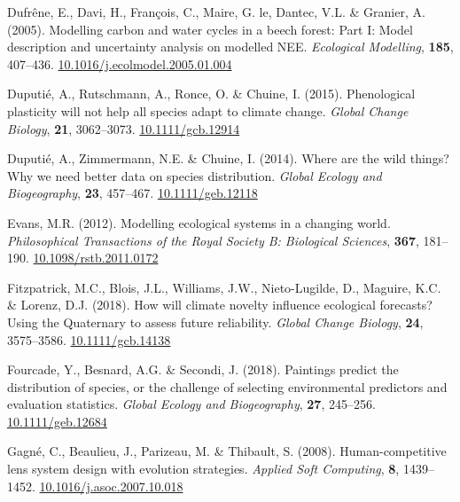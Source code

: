 \documentclass[11pt,]{article}
\newlength{\cslhangindent}
\newenvironment{CSLReferences}[2] %
 {%
  \setlength{\parindent}{0pt}
  \ifodd #1 \everypar{\setlength{\hangindent}{\cslhangindent}}\ignorespaces\fi
  \ifnum #2 > 0
  \setlength{\parskip}{#2\baselineskip}
  \fi
 }%
 {}
\begin{document}
\begin{CSLReferences}{1}{0}
\leavevmode{}%
Dufrêne, E., Davi, H., François, C., Maire, G. le, Dantec, V.L. \&
Granier, A. (2005). Modelling carbon and water cycles in a beech forest:
{Part} {I}: {Model} description and uncertainty analysis on modelled
{NEE}. \emph{Ecological Modelling}, \textbf{185}, 407--436.
\href{https://doi.org/10.1016/j.ecolmodel.2005.01.004}{10.1016/j.ecolmodel.2005.01.004}

\leavevmode{}%
Duputié, A., Rutschmann, A., Ronce, O. \& Chuine, I. (2015).
Phenological plasticity will not help all species adapt to climate
change. \emph{Global Change Biology}, \textbf{21}, 3062--3073.
\href{https://doi.org/10.1111/gcb.12914}{10.1111/gcb.12914}

\leavevmode{}%
Duputié, A., Zimmermann, N.E. \& Chuine, I. (2014). Where are the wild
things? Why we need better data on species distribution. \emph{Global
Ecology and Biogeography}, \textbf{23}, 457--467.
\href{https://doi.org/10.1111/geb.12118}{10.1111/geb.12118}

\leavevmode{}%
Evans, M.R. (2012). Modelling ecological systems in a changing world.
\emph{Philosophical Transactions of the Royal Society B: Biological
Sciences}, \textbf{367}, 181--190.
\href{https://doi.org/10.1098/rstb.2011.0172}{10.1098/rstb.2011.0172}

\leavevmode{}%
Fitzpatrick, M.C., Blois, J.L., Williams, J.W., Nieto-Lugilde, D.,
Maguire, K.C. \& Lorenz, D.J. (2018). How will climate novelty influence
ecological forecasts? {Using} the {Quaternary} to assess future
reliability. \emph{Global Change Biology}, \textbf{24}, 3575--3586.
\href{https://doi.org/10.1111/gcb.14138}{10.1111/gcb.14138}

\leavevmode{}%
Fourcade, Y., Besnard, A.G. \& Secondi, J. (2018). Paintings predict the
distribution of species, or the challenge of selecting environmental
predictors and evaluation statistics. \emph{Global Ecology and
Biogeography}, \textbf{27}, 245--256.
\href{https://doi.org/10.1111/geb.12684}{10.1111/geb.12684}

\leavevmode{}%
Gagné, C., Beaulieu, J., Parizeau, M. \& Thibault, S. (2008).
Human-competitive lens system design with evolution strategies.
\emph{Applied Soft Computing}, \textbf{8}, 1439--1452.
\href{https://doi.org/10.1016/j.asoc.2007.10.018}{10.1016/j.asoc.2007.10.018}


\end{CSLReferences}
\end{document}
